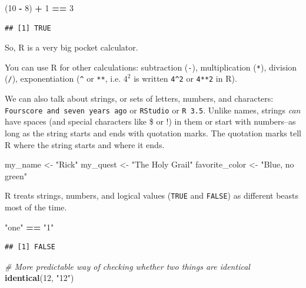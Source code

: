 \documentclass[]{article}
\newenvironment{Shaded}{\begin{snugshade}}{\end{snugshade}}
\newcommand{\KeywordTok}[1]{\textcolor[rgb]{0.13,0.29,0.53}{\textbf{#1}}}
\newcommand{\DecValTok}[1]{\textcolor[rgb]{0.00,0.00,0.81}{#1}}
\newcommand{\StringTok}[1]{\textcolor[rgb]{0.31,0.60,0.02}{#1}}
\newcommand{\CommentTok}[1]{\textcolor[rgb]{0.56,0.35,0.01}{\textit{#1}}}
\newcommand{\OperatorTok}[1]{\textcolor[rgb]{0.81,0.36,0.00}{\textbf{#1}}}
\newcommand{\NormalTok}[1]{#1}
\begin{document}
\begin{Shaded}
\begin{Highlighting}[]
\NormalTok{(}\DecValTok{10} \OperatorTok{-}\StringTok{ }\DecValTok{8}\NormalTok{) }\OperatorTok{+}\StringTok{ }\DecValTok{1} \OperatorTok{==}\StringTok{ }\DecValTok{3}
\end{Highlighting}
\end{Shaded}

\begin{verbatim}
## [1] TRUE
\end{verbatim}

So, R is a very big pocket calculator.

You can use R for other calculations: subtraction (\texttt{-}),
multiplication (\texttt{*}), division (\texttt{/}), exponentiation
(\texttt{\^{}} or \texttt{**}, i.e. \(4^2\) is written \texttt{4\^{}2}
or \texttt{4**2} in R).

We can also talk about strings, or sets of letters, numbers, and
characters:
\texttt{\textquotesingle{}Fourscore\ and\ seven\ years\ ago\textquotesingle{}}
or \texttt{\textquotesingle{}RStudio\textquotesingle{}} or
\texttt{\textquotesingle{}R\ 3.5\textquotesingle{}}. Unlike names,
strings \emph{can} have spaces (and special characters like \$ or !) in
them or start with numbers--as long as the string starts and ends with
quotation marks. The quotation marks tell R where the string starts and
where it ends.

\begin{Shaded}
\begin{Highlighting}[]
\NormalTok{my_name <-}\StringTok{ "Rick"}
\NormalTok{my_quest <-}\StringTok{ "The Holy Grail"}
\NormalTok{favorite_color <-}\StringTok{ "Blue, no green"}
\end{Highlighting}
\end{Shaded}

R treats strings, numbers, and logical values (\texttt{TRUE} and
\texttt{FALSE}) as different beasts most of the time.

\begin{Shaded}
\begin{Highlighting}[]
\StringTok{"one"} \OperatorTok{==}\StringTok{ "1"}
\end{Highlighting}
\end{Shaded}

\begin{verbatim}
## [1] FALSE
\end{verbatim}

\begin{Shaded}
\begin{Highlighting}[]
\CommentTok{# More predictable way of checking whether two things are identical}
\KeywordTok{identical}\NormalTok{(}\DecValTok{12}\NormalTok{, }\StringTok{"12"}\NormalTok{)}
\end{Highlighting}
\end{Shaded}
\end{document}
